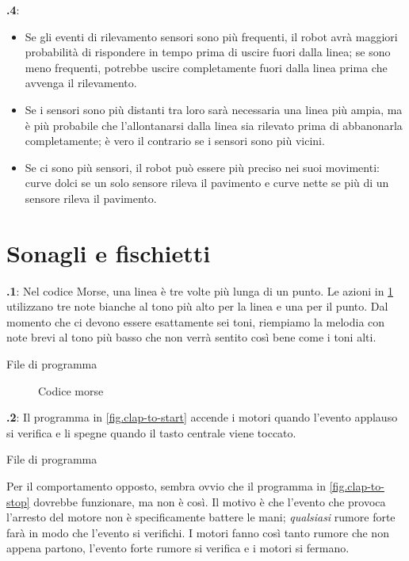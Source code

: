 \documentclass[12pt,a4paper,italian]{article}
\begin{document}
\textbf{\thesection.4}:
\begin{itemize}
\item Se gli eventi di rilevamento sensori sono più frequenti, il robot avrà
maggiori probabilità di rispondere in tempo prima di uscire fuori dalla linea; se sono meno
frequenti, potrebbe uscire completamente fuori dalla linea prima che avvenga il rilevamento.
\item Se i sensori sono più distanti tra loro sarà necessaria una linea più ampia, ma
è più probabile che l'allontanarsi dalla linea sia rilevato prima di abbanonarla completamente; è vero il contrario se i sensori sono più vicini.
\item Se ci sono più sensori, il robot può essere più preciso nei suoi
movimenti: curve dolci se un solo sensore rileva il pavimento e curve 
nette se più di un sensore rileva il pavimento.
\end{itemize}

\section{Sonagli e fischietti}

\textbf{\thesection.1}:
Nel codice Morse, una linea è tre volte più lunga di un punto. Le azioni in
\cref{fig.morse} utilizzano tre note bianche al tono più alto per la
linea e una per il punto. Dal momento che ci devono essere esattamente sei toni, riempiamo
la melodia con note brevi al tono più basso che non verrà sentito
così bene come i toni alti.

{\raggedleft \hfill File di programma }

\begin{figure}
\begin{center}
\caption{Codice morse}\label{fig.morse}
\end{center}
\end{figure}


\textbf{\thesection.2}: Il programma in \cref{fig.clap-to-start} accende i motori quando
l'evento applauso si verifica  e li spegne quando il tasto centrale viene
toccato.

{\raggedleft \hfill File di programma }

Per il comportamento opposto, sembra ovvio che il programma in
\cref{fig.clap-to-stop} dovrebbe funzionare, ma non è così. Il motivo è
che l'evento che provoca l'arresto del motore non è specificamente
battere le mani; \emph{qualsiasi} rumore forte farà in modo che l'evento si verifichi. I motori fanno così tanto rumore che non appena partono, l'evento forte rumore si verifica e i motori si fermano.
\end{document}
